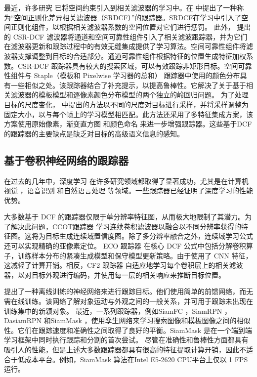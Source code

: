 最近，许多研究 \cite{Danelljan2015LearningSR, Lukezic2017DiscriminativeCF} 已将空间约束引入到相关滤波器的学习中。在 \cite{Danelljan2015LearningSR} 中提出了一种称为“空间正则化差异相关滤波器（SRDCF）”的跟踪器。SRDCF在学习中引入了空间正则化组件，以根据相关滤波器系数的空间位置对它们进行惩罚。
此外，\cite{Lukezic2017DiscriminativeCF} 提出的 CSR-DCF 滤波器将通道和空间可靠性组件引入了相关滤波跟踪器，并为它们在滤波器更新和跟踪过程中的有效无缝集成提供了学习算法。空间可靠性组件将滤波器支撑调整到目标的合适部分。通道可靠性组件根据特征的位置生成特征加权系数。CSR-DCF 跟踪器具有较大的搜索区域，可以有效跟踪非矩形目标。空间可靠性组件与 Staple（模板和 Pixelwise 学习器的总和） \cite{Bertinetto2016StapleC} 跟踪器中使用的颜色分布具有一些相似之处。该跟踪器结合了补充提示，以提高鲁棒性。它解决了关于基于相关滤波器的模板模型和逐像素颜色分布模型的两个独立的岭回归问题。
为了处理目标的尺度变化， \cite{Li2014ASA} 中提出的方法以不同的尺度对目标进行采样，并将采样调整为固定大小，以与每个帧上的学习模型相匹配。此方法还采用了多特征集成方案，该方案使用原始像素，渐变直方图 \cite{Forsyth2014ObjectDW} 和颜色命名 \cite{Weijer2009LearningCN} 来进一步增强跟踪器。这些基于DCF的跟踪器的主要缺点是缺乏对目标的高级语义信息的感知。

\subsection{基于卷积神经网络的跟踪器}
在过去的几年中，深度学习 \cite{Goodfellow2015DeepL} 在许多研究领域都取得了显著成功，尤其是在计算机视觉 \cite{Matiz2019InductiveCP, Zhu2019RotatedCR, Xiao2019DenseSE}，语音识别 \cite{Kim2016JointCB, Liu2019AttentionGD}和自然语言处理 \cite{Vinyals2014GrammarAA, Yousfi2017ContributionOR} 等领域。一些跟踪器已经证明了深度学习的性能优势。

大多数基于 DCF 的跟踪器仅限于单分辨率特征图，从而极大地限制了其潜力。为了解决此问题，CCOT跟踪器 \cite{CCOT} 学习连续卷积滤波器以融合以不同分辨率获得的特征图。这将为目标生成连续域置信度图。除了多分辨率融合之外，连续域学习公式还可以实现精确的亚像素定位。
ECO 跟踪器 \cite{Danelljan2017ECOEC} 在核心 DCF 公式中包括分解卷积算子，训练样本分布的紧凑生成模型和保守模型更新策略。由于使用了 CNN 特征，这减轻了计算开销。相反，CF2 跟踪器 \cite{Ma2015HierarchicalCF} 自适应地学习每个卷积层上的相关滤波器，以对目标外观进行编码，并使用每一层的相关响应来推断目标位置。

\cite{GOTURN} 提出了一种离线训练的神经网络来进行跟踪目标。他们使用简单的前馈网络，而无需在线训练。该网络了解对象运动与外观之间的一般关系，并可用于跟踪未出现在训练集中的新颖对象。
最近，一系列跟踪器，例如SiamFC \cite{SiamFC}，SiamRPN \cite{SiamRPN}，DasiamRPN \cite{zhu2018distractor} 和SiamMask \cite{Wang2018SiamMask}，使用孪生网络来学习搜索图像和模板图像之间的相似性。它们在跟踪速度和准确性之间取得了良好的平衡。SiamMask 是在一个端到端学习框架中同时执行跟踪和分割的首次尝试。
尽管在准确性和鲁棒性方面都具有吸引人的性能，但是上述大多数跟踪器都具有很高的特征提取计算开销，因此不适合于低成本平台。例如，SiamMask 算法在Intel E5-2620 CPU平台上仅以 1 FPS 运行。

